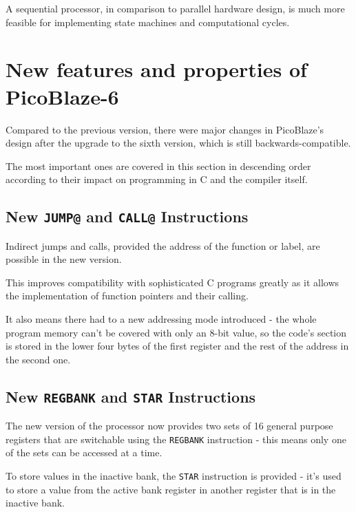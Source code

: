     A sequential processor, in comparison to parallel hardware design, is much more feasible for implementing state machines and computational cycles.


    \section{New features and properties of PicoBlaze-6}

    Compared to the previous version, there were major changes in PicoBlaze's design after the upgrade to the sixth version, which is still backwards-compatible.

    The most important ones are covered in this section in descending order according to their impact on programming in C and the compiler itself.

        \subsection{New \texttt{JUMP@} and \texttt{CALL@} Instructions}

        Indirect jumps and calls, provided the address of the function or label, are possible in the new version.

        This improves compatibility with sophisticated C programs greatly as it allows the implementation of function pointers and their calling.

        It also means there had to a new addressing mode introduced - the whole program memory can't be covered with only an 8-bit value, so the code's section is stored in the lower four bytes of the first register and the rest of the address in the second one.

        \subsection{New \texttt{REGBANK} and \texttt{STAR} Instructions}

        The new version of the processor now provides two sets of 16 general purpose registers that are switchable using the \texttt{REGBANK} instruction - this means only one of the sets can be accessed at a time.

        To store values in the inactive bank, the \texttt{STAR} instruction is provided - it's used to store a value from the active bank register in another register that is in the inactive bank.

